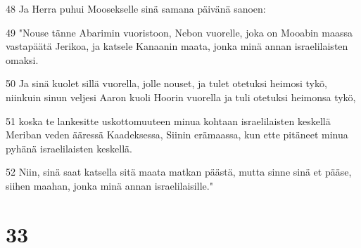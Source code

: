 \par 48 Ja Herra puhui Moosekselle sinä samana päivänä sanoen:
\par 49 "Nouse tänne Abarimin vuoristoon, Nebon vuorelle, joka on Mooabin maassa vastapäätä Jerikoa, ja katsele Kanaanin maata, jonka minä annan israelilaisten omaksi.
\par 50 Ja sinä kuolet sillä vuorella, jolle nouset, ja tulet otetuksi heimosi tykö, niinkuin sinun veljesi Aaron kuoli Hoorin vuorella ja tuli otetuksi heimonsa tykö,
\par 51 koska te lankesitte uskottomuuteen minua kohtaan israelilaisten keskellä Meriban veden ääressä Kaadeksessa, Siinin erämaassa, kun ette pitäneet minua pyhänä israelilaisten keskellä.
\par 52 Niin, sinä saat katsella sitä maata matkan päästä, mutta sinne sinä et pääse, siihen maahan, jonka minä annan israelilaisille."

\chapter{33}

